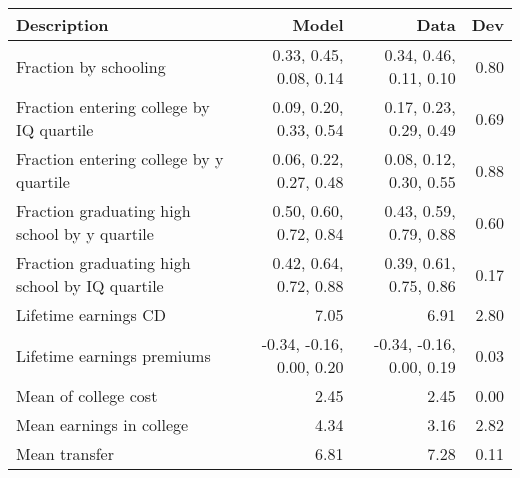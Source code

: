 \begin{tabular}{lrrr}
\hline
Description & Model  & Data  & Dev  \\ 
\hline
Fraction by schooling & 0.33, 0.45, 0.08, 0.14  & 0.34, 0.46, 0.11, 0.10  & 0.80  \\ 
Fraction entering college by IQ quartile & 0.09, 0.20, 0.33, 0.54  & 0.17, 0.23, 0.29, 0.49  & 0.69  \\ 
Fraction entering college by y quartile & 0.06, 0.22, 0.27, 0.48  & 0.08, 0.12, 0.30, 0.55  & 0.88  \\ 
Fraction graduating high school by y quartile & 0.50, 0.60, 0.72, 0.84  & 0.43, 0.59, 0.79, 0.88  & 0.60  \\ 
Fraction graduating high school by IQ quartile & 0.42, 0.64, 0.72, 0.88  & 0.39, 0.61, 0.75, 0.86  & 0.17  \\ 
Lifetime earnings CD & 7.05  & 6.91  & 2.80  \\ 
Lifetime earnings premiums & -0.34, -0.16, 0.00, 0.20  & -0.34, -0.16, 0.00, 0.19  & 0.03  \\ 
Mean of college cost & 2.45  & 2.45  & 0.00  \\ 
Mean earnings in college & 4.34  & 3.16  & 2.82  \\ 
Mean transfer & 6.81  & 7.28  & 0.11  \\ 
\hline
\end{tabular}%
